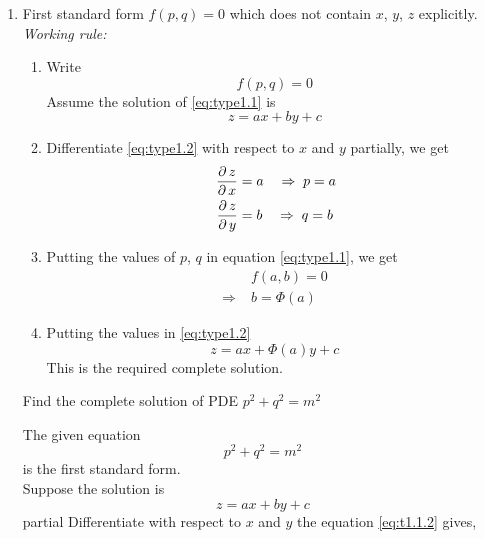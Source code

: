 \documentclass[../main-sheet.tex]{subfiles}
\begin{document}
\begin{enumerate}[label=\underline{Type - \Roman*}:]
    \item First standard form \(f(p,q)=0\) which does not contain \(x\), \(y\), \(z\) explicitly.\\
    \emph{Working rule:}
    \begin{enumerate}[label=\arabic*]
        \item Write \begin{equation}
            f(p,q)=0\label{eq:type1.1}
        \end{equation}
        Assume the solution of \eqref{eq:type1.1} is 
        \begin{equation}
            z=ax+by+c\label{eq:type1.2}
        \end{equation}
        \item Differentiate \eqref{eq:type1.2} with respect to \(x\) and \(y\) partially, we get
        \begin{align*}
            \,\frac{\partial\, z}{\partial\, x}&=a\quad\Rightarrow\;p=a\\
            \,\frac{\partial\, z}{\partial\, y}&=b\quad\Rightarrow\;q=b
        \end{align*}
        \item Putting the values of \(p\), \(q\) in equation \eqref{eq:type1.1}, we get 
        \begin{align*}
            &f(a,b)=0\\
            \Rightarrow\;& b=\Phi(a)
        \end{align*}
        \item Putting the values in \eqref{eq:type1.2}
        \[z=ax+\Phi(a)y+c\]
        This is the required complete solution.
    \end{enumerate}
        \begin{prob}
            Find the complete solution of PDE \(p^2+q^2=m^2\)
        \end{prob}
        \begin{soln}
            The given equation 
            \begin{equation}
                p^2+q^2=m^2\label{eq:t1.1.1}
            \end{equation}
            is the first standard form.\\
            Suppose the solution is 
            \begin{equation}
                z=ax+by+c\label{eq:t1.1.2}
            \end{equation}
            partial Differentiate with respect to \(x\) and \(y\) the equation \eqref{eq:t1.1.2} gives,

\end{soln}
\end{enumerate}
\end{document}
